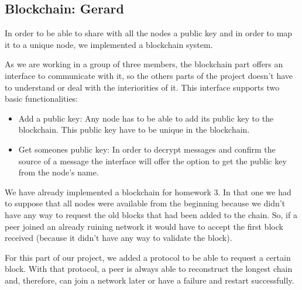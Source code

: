 \documentclass[12pt,a4paper,draft]{article}
\begin{document}
\subsection{Blockchain: Gerard}

In order to be able to share with all the nodes a public key and in order to map it to a unique node, we implemented a blockchain system.

As we are working in a group of three members, the blockchain part offers an interface to communicate with it, so the others parts of the project doesn't have to understand or deal with the interiorities of it.
This interface supports two basic functionalities:

\begin{itemize}
 \item Add a public key: Any node has to be able to add its public key to the blockchain. This public key have to be unique in the blockchain.
 \item Get someones public key: In order to decrypt messages and confirm the source of a message the interface will offer the option to get the public key from the node's name.
\end{itemize}

We have already implemented a blockchain for homework 3.
In that one we had to suppose that all nodes were available from the beginning because we didn't have any way to request the old blocks that had been added to the chain.
So, if a peer joined an already ruining network it would have to accept the first block received (because it didn't have any way to validate the block).

For this part of our project, we added a protocol to be able to request a certain block.
With that protocol, a peer is always able to reconstruct the longest chain and, therefore, can join a network later or have a failure and restart successfully.
\end{document}
